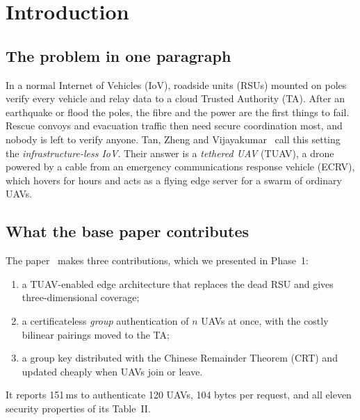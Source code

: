 \section{Introduction}\label{sec:intro}

\subsection{The problem in one paragraph}
In a normal Internet of Vehicles (IoV), roadside units (RSUs) mounted on poles verify every vehicle and relay data to a cloud
Trusted Authority (TA). After an earthquake or flood the poles, the fibre and the power are the first things to fail. Rescue convoys
and evacuation traffic then need secure coordination most, and nobody is left to verify anyone. Tan, Zheng and Vijayakumar~\cite{base}
call this setting the \emph{infrastructure-less IoV}. Their answer is a \emph{tethered UAV} (TUAV), a drone powered by a cable from an
emergency communications response vehicle (ECRV), which hovers for hours and acts as a flying edge server for a swarm of ordinary UAVs.

\subsection{What the base paper contributes}
The paper~\cite{base} makes three contributions, which we presented in Phase~1:
\begin{enumerate}[label=\textbf{(\roman*)}]
  \item a TUAV-enabled edge architecture that replaces the dead RSU and gives three-dimensional coverage;
  \item a certificateless \emph{group} authentication of $n$ UAVs at once, with the costly bilinear pairings moved to the TA;
  \item a group key distributed with the Chinese Remainder Theorem (CRT) and updated cheaply when UAVs join or leave.
\end{enumerate}
It reports 151\,ms to authenticate 120 UAVs, 104 bytes per request, and all eleven security properties of its Table~II.

